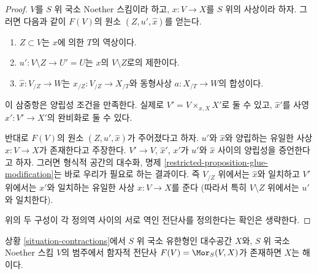\begin{proof}
$V$를 $S$ 위 국소 Noether 스킴이라 하고,
$x : V \to X$를 $S$ 위의 사상이라 하자.
그러면 다음과 같이 $F(V)$의 원소 $(Z, u', \hat x)$를 얻는다.
\begin{enumerate}
\item $Z \subset V$는 $x$에 의한 $T$의 역상이다.
\item $u' : V \setminus Z \to U' = U$는 $x$의 $V \setminus Z$로의 제한이다.
\item $\hat x : V_{/Z} \to W$는
$x_{/Z} : V_{/Z} \to X_{/T}$와 동형사상 $a : X_{/T} \to W$의 합성이다.
\end{enumerate}
이 삼중항은 양립성 조건을 만족한다. 실제로
$V' = V \times_{x, X} X'$로 둘 수 있고,
$\hat x'$를 사영 $x' : V' \to X'$의 완비화로 둘 수 있다.

\medskip\noindent
반대로 $F(V)$의 원소 $(Z, u', \hat x)$가 주어졌다고 하자.
$u'$와 $\hat x$와 양립하는 유일한 사상 $x : V \to X$가 존재한다고 주장한다.
$V' \to V$, $\hat x'$, $x'$가 $u'$와 $\hat x$ 사이의 양립성을
증언한다고 하자. 그러면 형식적 공간의 대수화, 명제
\ref{restricted-proposition-glue-modification}는 바로 우리가 필요로 하는
결과이다. 즉 $V_{/Z}$ 위에서는 $\hat x$와 일치하고 $V'$ 위에서는
$x'$와 일치하는 유일한 사상 $x : V \to X$를 준다
(따라서 특히 $V \setminus Z$ 위에서는 $u'$와 일치한다).

\medskip\noindent
위의 두 구성이 각 정의역 사이의 서로 역인 전단사를 정의한다는 확인은
생략한다.
\end{proof}

\begin{lemma}
\label{lemma-functor-is-solution}
상황 \ref{situation-contractions}에서 $S$ 위 국소 유한형인 대수공간
$X$와, $S$ 위 국소 Noether 스킴 $V$의 범주에서 함자적 전단사
$F(V) = \Mor_S(V, X)$가 존재하면 $X$는 해이다.
\end{lemma}

